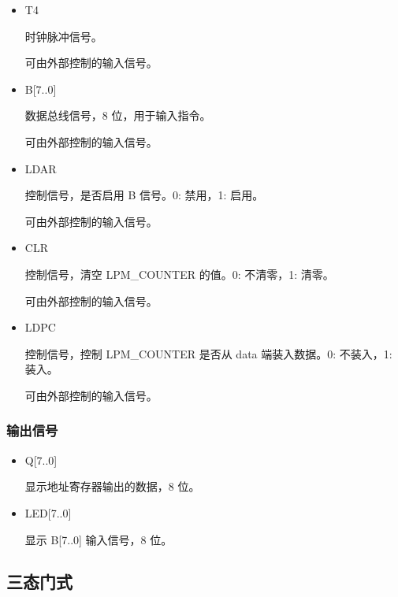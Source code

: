 \begin{itemize}
    \item T4
    
    时钟脉冲信号。

    可由外部控制的输入信号。
    
    \item B[7..0]
    
    数据总线信号，8 位，用于输入指令。
    
    可由外部控制的输入信号。
    
    \item LDAR
    
    控制信号，是否启用 B 信号。0: 禁用，1: 启用。
    
    可由外部控制的输入信号。
    
    \item CLR
    
    控制信号，清空 LPM\_COUNTER 的值。0: 不清零，1: 清零。
    
    可由外部控制的输入信号。
    
    \item LDPC
    
    控制信号，控制 LPM\_COUNTER 是否从 data 端装入数据。0: 不装入，1: 装入。
    
    可由外部控制的输入信号。
    
\end{itemize} 

\subsubsection{输出信号}

\begin{itemize}
    \item Q[7..0]
    
    显示地址寄存器输出的数据，8 位。
    
    \item LED[7..0]
    
    显示 B[7..0] 输入信号，8 位。
    
\end{itemize}

\subsection{三态门式}


